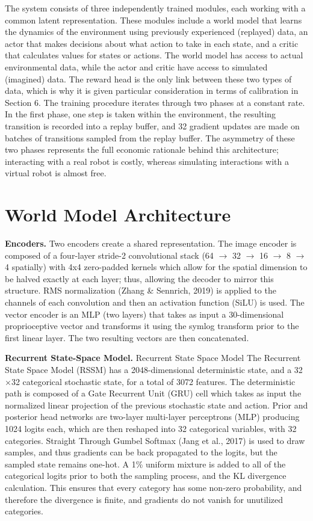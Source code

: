 \documentclass[12pt,a4paper,oneside]{report}
\begin{document}
The system consists of three independently trained modules, each working with a common latent representation. These modules include a world model that learns the dynamics of the environment using previously experienced (replayed) data, an actor that makes decisions about what action to take in each state, and a critic that calculates values for states or actions. The world model has access to actual environmental data, while the actor and critic have access to simulated (imagined) data. The reward head is the only link between these two types of data, which is why it is given particular consideration in terms of calibration in Section 6. The training procedure iterates through two phases at a constant rate. In the first phase, one step is taken within the environment, the resulting transition is recorded into a replay buffer, and 32 gradient updates are made on batches of transitions sampled from the replay buffer. The asymmetry of these two phases represents the full economic rationale behind this architecture; interacting with a real robot is costly, whereas simulating interactions with a virtual robot is almost free.

\hypertarget{world-model-architecture}{%
\section{World Model Architecture}\label{world-model-architecture}}

\textbf{Encoders.} Two encoders create a shared representation. The image encoder is composed of a four-layer stride-2 convolutional stack (64 $\rightarrow$ 32 $\rightarrow$ 16 $\rightarrow$ 8 $\rightarrow$ 4 spatially) with 4x4 zero-padded kernels which allow for the spatial dimension to be halved exactly at each layer; thus, allowing the decoder to mirror this structure. RMS normalization (Zhang \& Sennrich, 2019) is applied to the channels of each convolution and then an activation function (SiLU) is used. The vector encoder is an MLP (two layers) that takes as input a 30-dimensional proprioceptive vector and transforms it using the symlog transform prior to the first linear layer. The two resulting vectors are then concatenated.

\textbf{Recurrent State-Space Model.} 
Recurrent State Space Model The Recurrent State Space Model (RSSM) has a 2048-dimensional deterministic state, and a 32$\times$32 categorical stochastic state, for a total of 3072 features. The deterministic path is composed of a Gate Recurrent Unit (GRU) cell which takes as input the normalized linear projection of the previous stochastic state and action. Prior and posterior head networks are two-layer multi-layer perceptrons (MLP) producing 1024 logits each, which are then reshaped into 32 categorical variables, with 32 categories. Straight Through Gumbel Softmax (Jang et al., 2017) is used to draw samples, and thus gradients can be back propagated to the logits, but the sampled state remains one-hot. A 1\% uniform mixture is added to all of the categorical logits prior to both the sampling process, and the KL divergence calculation. This ensures that every category has some non-zero probability, and therefore the divergence is finite, and gradients do not vanish for unutilized categories.
\end{document}
